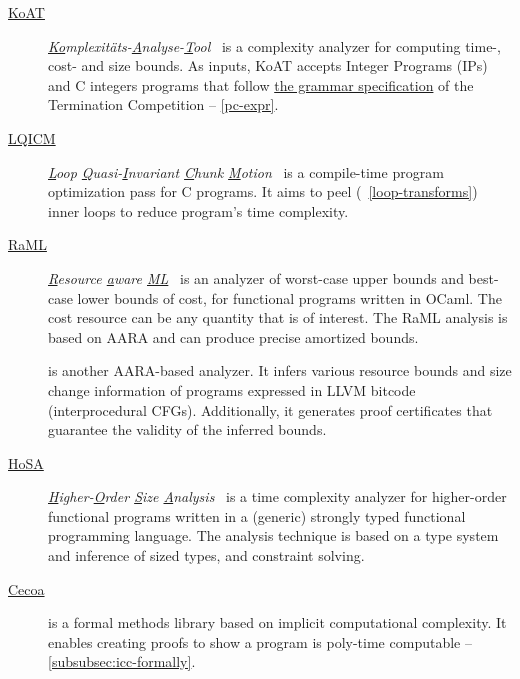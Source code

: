 \begin{description}
\item[\href{https://koat.verify.rwth-aachen.de/cfr_mprf}{KoAT}]
       \emph{\underline{Ko}mplexitäts-\underline{A}nalyse-\underline{T}ool}~\cite{brockschmidt2016}
       is a complexity analyzer for computing time-, cost- and size bounds.
       As inputs, KoAT accepts Integer Programs (IPs) and C integers programs that follow
       \href{https://termination-portal.org/wiki/C_Integer_Programs}{the grammar specification} of the Termination Competition -- \autoref{pc-expr}.

\item[\href{https://github.com/statycc/LQICM_On_C_Toy_Parser}{LQICM}]
      \emph{\underline{L}oop \underline{Q}uasi-\underline{I}nvariant \underline{C}hunk \underline{M}otion}~\cite{moyen20172}
       is a compile-time program optimization pass for C programs.
       It aims to peel (\cf~\autoref{loop-transforms}) inner loops to reduce program's time complexity.

\item[\href{https://www.raml.co/about}{RaML}]
       \emph{\underline{R}esource \underline{a}ware \underline{ML}}~\cite{hoffmann2017}
       is an analyzer of worst-case upper bounds and best-case lower bounds of cost, for functional programs written in OCaml.
       The cost resource can be any quantity that is of interest.
       The RaML analysis is based on AARA and can produce precise amortized bounds.

\item[\href{https://github.com/academic-archive/cav17-pastis}{}]\cite{carbonneaux2017,carbonneaux2018}
      is another AARA-based analyzer. It infers various resource bounds and size
      change information of programs expressed in LLVM bitcode (interprocedural
      CFGs). Additionally, it generates proof certificates that guarantee the
      validity of the inferred bounds.

\item[\href{http://cl-informatik.uibk.ac.at/users/zini/software/hosa/}{HoSA}]
      \emph{\underline{H}igher-\underline{O}rder \underline{S}ize \underline{A}nalysis}~\cite{avanzini2017}
      is a time complexity analyzer for higher-order functional programs written in a (generic) strongly typed functional programming language.
      The analysis technique is based on a type system and inference of sized types, and constraint solving.

\item[\href{https://github.com/davidnowak/cecoa}{Cecoa}]\cite{feree2018}
     is a formal methods library based on implicit computational complexity.
     It enables creating proofs to show a program is poly-time computable -- \autoref{subsubsec:icc-formally}.


\end{description}
